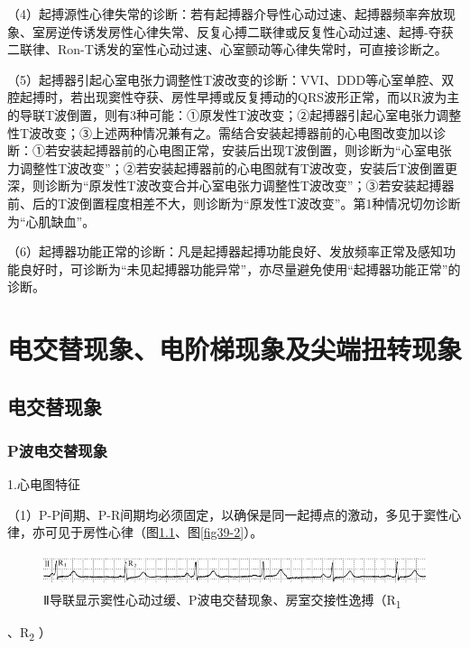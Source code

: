 （4）起搏源性心律失常的诊断：若有起搏器介导性心动过速、起搏器频率奔放现象、室房逆传诱发房性心律失常、反复心搏二联律或反复性心动过速、起搏-夺获二联律、Ron-T诱发的室性心动过速、心室颤动等心律失常时，可直接诊断之。

（5）起搏器引起心室电张力调整性T波改变的诊断：VVI、DDD等心室单腔、双腔起搏时，若出现窦性夺获、房性早搏或反复搏动的QRS波形正常，而以R波为主的导联T波倒置，则有3种可能：①原发性T波改变；②起搏器引起心室电张力调整性T波改变；③上述两种情况兼有之。需结合安装起搏器前的心电图改变加以诊断：①若安装起搏器前的心电图正常，安装后出现T波倒置，则诊断为“心室电张力调整性T波改变”；②若安装起搏器前的心电图就有T波改变，安装后T波倒置更深，则诊断为“原发性T波改变合并心室电张力调整性T波改变”；③若安装起搏器前、后的T波倒置程度相差不大，则诊断为“原发性T波改变”。第1种情况切勿诊断为“心肌缺血”。

（6）起搏器功能正常的诊断：凡是起搏器起搏功能良好、发放频率正常及感知功能良好时，可诊断为“未见起搏器功能异常”，亦尽量避免使用“起搏器功能正常”的诊断。

\protect\hypertarget{text00046.html}{}{}

\protect\hypertarget{text00046.htmlux5cux23chapter46}{}{}

\chapter{电交替现象、电阶梯现象及尖端扭转现象}

\protect\hypertarget{text00046.htmlux5cux23subid510}{}{}

\section{电交替现象}

\protect\hypertarget{text00046.htmlux5cux23subid511}{}{}

\subsection{P波电交替现象}

1.心电图特征

（1）P-P间期、P-R间期均必须固定，以确保是同一起搏点的激动，多见于窦性心律，亦可见于房性心律（图\ref{fig39-1}、图\ref{fig39-2}）。

\begin{figure}[!htbp]
 \centering
 \includegraphics[width=5.58333in,height=0.375in]{./images/Image00650.jpg}
 \captionsetup{justification=centering}
 \caption{Ⅱ导联显示窦性心动过缓、P波电交替现象、房室交接性逸搏（R\textsubscript{1}}
 \label{fig39-1}
  \end{figure} 
、R\textsubscript{2} ）

